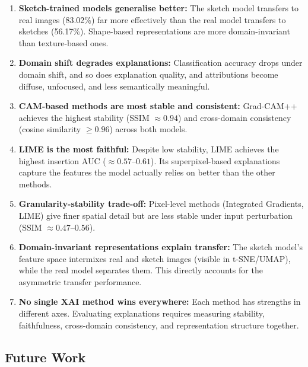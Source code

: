 \documentclass[12pt, a4paper]{article}
\begin{document}
\begin{enumerate}[leftmargin=*]
    \item \textbf{Sketch-trained models generalise better:}  The sketch model
          transfers to real images (83.02\%) far more effectively than the real
          model transfers to sketches (56.17\%).  Shape-based representations
          are more domain-invariant than texture-based ones.

    \item \textbf{Domain shift degrades explanations:}  Classification accuracy
          drops under domain shift, and so does explanation quality, and attributions become diffuse, unfocused, and less semantically
          meaningful.

    \item \textbf{CAM-based methods are most stable and consistent:}
          Grad-CAM++ achieves the highest stability (SSIM $\approx 0.94$) and
          cross-domain consistency (cosine similarity $\geq 0.96$) across both
          models.

    \item \textbf{LIME is the most faithful:}  Despite low stability, LIME
          achieves the highest insertion AUC ($\approx 0.57$--$0.61$).  Its
          superpixel-based explanations capture the features the model actually
          relies on better than the other methods.

    \item \textbf{Granularity-stability trade-off:}  Pixel-level methods
          (Integrated Gradients, LIME) give finer spatial detail but are less
          stable under input perturbation (SSIM $\approx 0.47$--$0.56$).

    \item \textbf{Domain-invariant representations explain transfer:}
          The sketch model's feature space intermixes real and sketch images
          (visible in t-SNE/UMAP), while the real model separates them.
          This directly accounts for the asymmetric transfer performance.

    \item \textbf{No single XAI method wins everywhere:}  Each method has
          strengths in different axes.  Evaluating explanations requires
          measuring stability, faithfulness, cross-domain consistency, and
          representation structure together.
\end{enumerate}

\subsection{Future Work}
\end{document}
